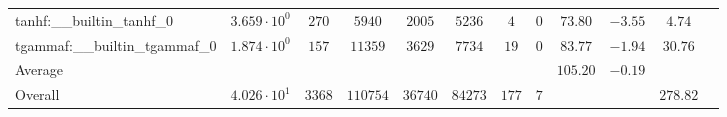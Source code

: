 \begin{tabular}{|l|c|c|c|c|c|c|c|c|c|c|c|}
tanhf:\_\_builtin\_tanhf\_0               & $ 3.659 \cdot 10^{0}  $ & $ 270    $ & $ 5940   $ & $ 2005  $ & $ 5236  $ & $ 4   $ & $ 0 $ & $ 73.80       $ & $ -3.55   $ & $ 4.74    $ \\
tgammaf:\_\_builtin\_tgammaf\_0           & $ 1.874 \cdot 10^{0}  $ & $ 157    $ & $ 11359  $ & $ 3629  $ & $ 7734  $ & $ 19  $ & $ 0 $ & $ 83.77       $ & $ -1.94   $ & $ 30.76   $ \\
\hline
Average                                   & $                     $ & $        $ & $        $ & $       $ & $       $ & $     $ & $   $ & $ 105.20      $ & $ -0.19   $ & $         $ \\
\hline
Overall                                   & $ 4.026 \cdot 10^{1}  $ & $ 3368   $ & $ 110754 $ & $ 36740 $ & $ 84273 $ & $ 177 $ & $ 7 $ & $             $ & $         $ & $ 278.82  $ \\
\hline
\end{tabular}
